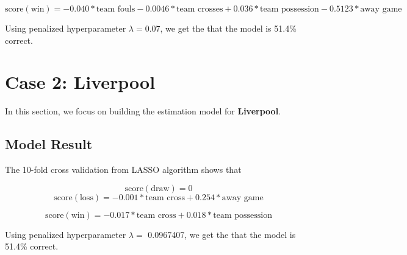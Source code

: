 \documentclass[]{book}
\theoremstyle{definition}
\theoremstyle{definition}
\theoremstyle{definition}
\theoremstyle{remark}
\begin{document}
\[ \text{score}(\text{win}) = -0.040 * \text{team fouls} - 0.0046 * \text{team crosses} + 0.036 * \text{team possession} - 0.5123 * \text{away game} \]

Using penalized hyperparameter \(\lambda= 0.07\), we get the that the
model is 51.4\% correct.

\section{Case 2: Liverpool}\label{case-2-liverpool}

In this section, we focus on building the estimation model for
\textbf{Liverpool}.

\subsection{Model Result}\label{model-result-1}

The 10-fold cross validation from LASSO algorithm shows that

\[ \text{score}(\text{draw}) = 0 \]
\[ \text{score}(\text{loss}) = -0.001 * \text{team cross} + 0.254 * \text{away game} \]

\[ \text{score}(\text{win}) = -0.017 * \text{team cross} + 0.018 * \text{team possession} \]

Using penalized hyperparameter \(\lambda=\) 0.0967407, we get the that
the model is 51.4\% correct.


\end{document}

